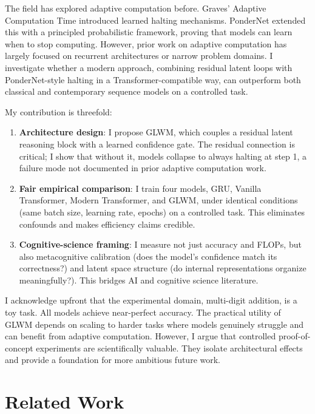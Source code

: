 \documentclass[11pt]{article}
\begin{document}
The field has explored adaptive computation before. Graves' Adaptive Computation Time\cite{Graves2016} introduced learned halting mechanisms. PonderNet\cite{Banino2021} extended this with a principled probabilistic framework, proving that models can learn when to stop computing. However, prior work on adaptive computation has largely focused on recurrent architectures or narrow problem domains. I investigate whether a modern approach, combining residual latent loops with PonderNet-style halting in a Transformer-compatible way, can outperform both classical and contemporary sequence models on a controlled task.

My contribution is threefold:

\begin{enumerate}
    \item \textbf{Architecture design}: I propose GLWM, which couples a residual latent reasoning block with a learned confidence gate. The residual connection is critical; I show that without it, models collapse to always halting at step 1, a failure mode not documented in prior adaptive computation work.
    
    \item \textbf{Fair empirical comparison}: I train four models, GRU, Vanilla Transformer, Modern Transformer, and GLWM, under identical conditions (same batch size, learning rate, epochs) on a controlled task. This eliminates confounds and makes efficiency claims credible.
    
    \item \textbf{Cognitive-science framing}: I measure not just accuracy and FLOPs, but also metacognitive calibration (does the model's confidence match its correctness?) and latent space structure (do internal representations organize meaningfully?). This bridges AI and cognitive science literature.
\end{enumerate}

I acknowledge upfront that the experimental domain, multi-digit addition, is a toy task. All models achieve near-perfect accuracy. The practical utility of GLWM depends on scaling to harder tasks where models genuinely struggle and can benefit from adaptive computation. However, I argue that controlled proof-of-concept experiments are scientifically valuable. They isolate architectural effects and provide a foundation for more ambitious future work.

\section{Related Work}
\end{document}
